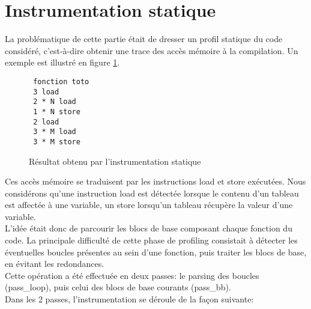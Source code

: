 \section{Instrumentation statique}

La problématique de cette partie était de dresser un profil statique du code considéré, c'est-à-dire obtenir une trace des accès mémoire à la compilation. Un exemple est illustré en figure \ref{fig:static_result}.

\begin{figure}[here]
  \centering
\begin{verbatim}
 fonction toto
 3 load
 2 * N load
 1 * N store
 2 load
 3 * M load
 3 * M store
\end{verbatim}
  \caption{Résultat obtenu par l'instrumentation statique}
  \label{fig:static_result}
\end{figure}

 Ces accès mémoire se traduisent par les instructions load et store exécutées. Nous considérons qu'une instruction load est détectée lorsque le contenu d'un tableau est affectée à une variable, un store lorsqu'un tableau récupère la valeur d'une variable.\\

L'idée était donc de parcourir les blocs de base composant chaque fonction du code. La principale difficulté de cette phase de profiling consistait à détecter les éventuelles boucles présentes au sein d'une fonction, puis traiter les blocs de base, en évitant les redondances.\\

Cette opération a été effectuée en deux passes: le parsing des boucles (pass\_loop), puis celui des blocs de base courants (pass\_bb).\\

Dans les 2 passes, l'instrumentation se déroule de la façon suivante:\\

